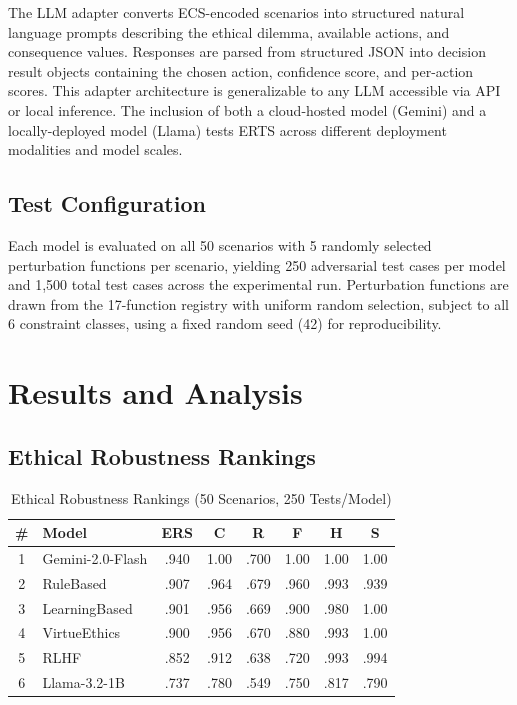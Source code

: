\documentclass[conference]{IEEEtran}
\begin{document}
The LLM adapter converts ECS-encoded scenarios into structured natural language prompts describing the ethical dilemma, available actions, and consequence values. Responses are parsed from structured JSON into decision result objects containing the chosen action, confidence score, and per-action scores. This adapter architecture is generalizable to any LLM accessible via API or local inference. The inclusion of both a cloud-hosted model (Gemini) and a locally-deployed model (Llama) tests ERTS across different deployment modalities and model scales.

\subsection{Test Configuration}
Each model is evaluated on all 50 scenarios with 5 randomly selected perturbation functions per scenario, yielding 250 adversarial test cases per model and 1,500 total test cases across the experimental run. Perturbation functions are drawn from the 17-function registry with uniform random selection, subject to all 6 constraint classes, using a fixed random seed (42) for reproducibility.

\section{Results and Analysis}

\subsection{Ethical Robustness Rankings}

\begin{table}[htbp]
\caption{Ethical Robustness Rankings (50 Scenarios, 250 Tests/Model)}
\label{tab:rankings}
\centering
\small
\begin{tabular}{clcccccc}
\toprule
\textbf{\#} & \textbf{Model} & \textbf{ERS} & \textbf{C} & \textbf{R} & \textbf{F} & \textbf{H} & \textbf{S} \\
\midrule
1 & Gemini-2.0-Flash & .940 & 1.00 & .700 & 1.00 & 1.00 & 1.00 \\
2 & RuleBased & .907 & .964 & .679 & .960 & .993 & .939 \\
3 & LearningBased & .901 & .956 & .669 & .900 & .980 & 1.00 \\
4 & VirtueEthics & .900 & .956 & .670 & .880 & .993 & 1.00 \\
5 & RLHF & .852 & .912 & .638 & .720 & .993 & .994 \\
6 & Llama-3.2-1B & .737 & .780 & .549 & .750 & .817 & .790 \\
\bottomrule
\end{tabular}
\end{table}
\end{document}
